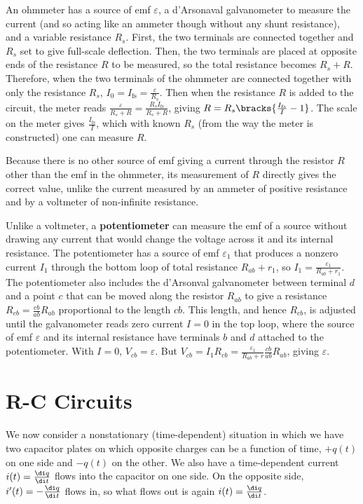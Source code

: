 An ohmmeter has a source of emf $\varepsilon$, a d'Arsonaval galvanometer to measure the current (and so acting like an ammeter though without any shunt resistance), and a variable resistance $R_s$. First, the two terminals are connected together and $R_s$ set to give full-scale deflection. Then, the two terminals are placed at opposite ends of the resistance $R$ to be measured, so the total resistance becomes $R_s + R$. Therefore, when the two terminals of the ohmmeter are connected together with only the resistance $R_s$, $I_0 = I_\text{fs} = \frac{\varepsilon}{R_s}$. Then when the resistance $R$ is added to the circuit, the meter reads $\frac{\varepsilon}{R_s + R} = \frac{R_sI_\text{fs}}{R_s + R}$, giving $R = R_s\bracks{ \frac{I_\text{fs}}{I} - 1 }$. The scale on the meter gives $\frac{I_\text{fs}}{I}$, which with known $R_s$ (from the way the meter is constructed) one can measure $R$.

Because there is no other source of emf giving a current through the resistor $R$ other than the emf in the ohmmeter, its measurement of $R$ directly gives the correct value, unlike the current measured by an ammeter of positive resistance and by a voltmeter of non-infinite resistance.

Unlike a voltmeter, a \textbf{potentiometer} can measure the emf of a source without drawing any current that would change the voltage across it and its internal resistance. The potentiometer has a source of emf $\varepsilon_1$ that produces a nonzero current $I_1$ through the bottom loop of total resistance $R_{ab} + r_1$, so $I_1 = \frac{\varepsilon_1}{R_{ab}+r_1}$. The potentiometer also includes the d'Arsonval galvanometer between terminal $d$ and a point $c$ that can be moved along the resistor $R_{ab}$ to give a resistance $R_{cb} = \frac{cb}{ab}R_{ab}$ proportional to the length $cb$. This length, and hence $R_{cb}$, is adjusted until the galvanometer reads zero current $I = 0$ in the top loop, where the source of emf $\varepsilon$ and its internal resistance have terminals $b$ and $d$ attached to the potentiometer. With $I=0$, $V_{cb} = \varepsilon$. But $V_{cb} = I_1R_{cb} = \frac{\varepsilon_1}{R_{ab} + r} \frac{cb}{ab} R_{ab}$, giving $\varepsilon$.

\section{R-C Circuits}

We now consider a nonstationary (time-dependent) situation in which we have two capacitor plates on which opposite charges can be a function of time, $+q(t)$ on one side and $-q(t)$ on the other. We also have a time-dependent current $i(t) = \frac{\di q}{\di t}$ flows into the capacitor on one side. On the opposite side, $i'(t) = -\frac{\di q}{\di t}$ flows in, so what flows out is again $i(t) = \frac{\di q}{\di t}$. 

